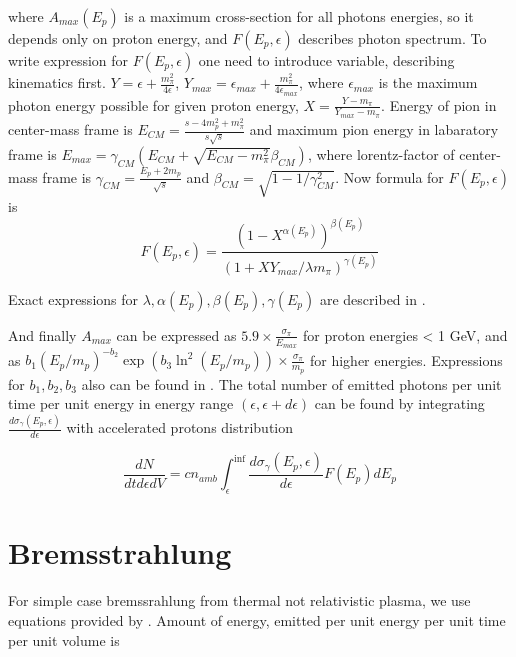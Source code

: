 where $A_{max}(E_p)$ is a maximum cross-section for all photons energies, so it depends only on proton energy, and $F\left(E_p,\epsilon\right)$ describes photon spectrum. To write expression for $F\left(E_p, \epsilon\right)$ one need to introduce variable, describing kinematics first. $Y=\epsilon+\frac{m_{\pi}^2}{4 \epsilon}$, $Y_{max}=\epsilon_{max}+\frac{m_{\pi}^2}{4 \epsilon_{max}}$, where $\epsilon_{max}$ is the maximum photon energy possible for given proton energy, $X=\frac{Y-m_{\pi}}{Y_{max}-m_{\pi}}$. Energy of pion in center-mass frame is $E_{CM}=\frac{s-4m_p^2+m_{\pi}^2}{s\sqrt{s}}$ and maximum pion energy in labaratory frame is $E_{max}=\gamma_{CM}\left(E_{CM}+\sqrt{E_{CM}-m_{\pi}^2}\beta_{CM}\right)$, where lorentz-factor of center-mass frame is $\gamma_{CM}=\frac{E_p+2m_p}{\sqrt{s}}$ and $\beta_{CM}=\sqrt{1-1/\gamma_{CM}^2}$. Now formula for $F\left(E_p,\epsilon\right)$ is
\begin{equation}
	F\left(E_p,\epsilon\right) = \frac{\left(1-X^{\alpha(E_p)}\right)^{\beta(E_p)}}{\left(1+X Y_{max}/\lambda m_{\pi}\right)^{\gamma(E_p)}}
\end{equation}

Exact expressions for $\lambda, \alpha(E_p), \beta(E_p), \gamma(E_p)$ are described in \cite{Kafexhiu}.

And finally $A_{max}$ can be expressed as $5.9\times\frac{\sigma_{\pi}}{E_{max}}$ for proton energies < 1 GeV, and as $b_1 \left(E_p/m_p\right)^{-b_2}\exp\left(b_3 \ln^2\left(E_p/m_p\right)\right)\times\frac{\sigma_{\pi}}{m_p}$ for higher energies. Expressions for $b_1, b_2, b_3$ also can be found in \cite{Kafexhiu}. The total number of emitted photons per unit time per unit energy in energy range $\left(\epsilon, \epsilon + d\epsilon\right)$ can be found by integrating $\frac{d\sigma_{\gamma}\left(E_p, \epsilon\right)}{d\epsilon}$ with accelerated protons distribution

\begin{equation}
	\frac{dN}{dt d\epsilon dV} = c n_{amb} \int_{\epsilon}^{\inf}\frac{d\sigma_{\gamma}\left(E_p, \epsilon\right)}{d\epsilon} F(E_p) dE_p
\end{equation} 

\section{Bremsstrahlung}\label{BremsstrahlungFormulaeSection}

For simple case bremssrahlung from thermal not relativistic plasma, we use equations provided by \cite{Rybicki}. Amount of energy, emitted per unit energy per unit time per unit volume is

